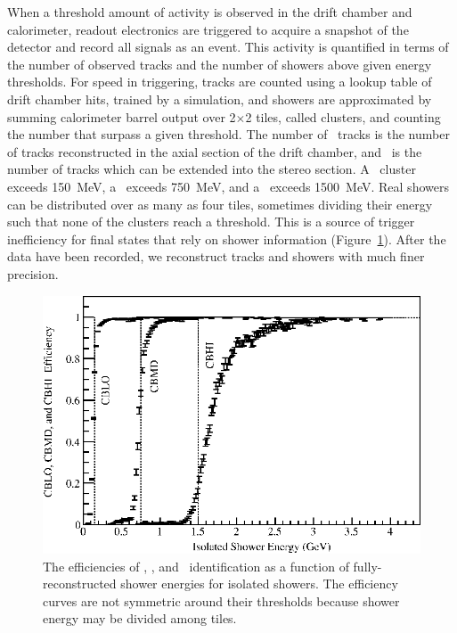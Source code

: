 \documentclass{cornell}
\begin{document}
When a threshold amount of activity is observed in the drift chamber
and calorimeter, readout electronics are triggered to acquire a
snapshot of the detector and record all signals as an event.  This
activity is quantified in terms of the number of observed tracks and
the number of showers above given energy thresholds.  For speed in
triggering, tracks are counted using a lookup table of drift chamber
hits, trained by a simulation, and showers are approximated by summing
calorimeter barrel output over 2$\times$2 tiles, called clusters, and
counting the number that surpass a given threshold.  The number of
\axial\ tracks is the number of tracks reconstructed in the axial
section of the drift chamber, and \stereo\ is the number of tracks
which can be extended into the stereo section.  A \cblo\ cluster
exceeds 150~MeV, a \cbmd\ exceeds 750~MeV, and a \cbhi\ exceeds
1500~MeV.  Real showers can be distributed over as many as four tiles,
sometimes dividing their energy such that none of the clusters reach a
threshold.  This is a source of trigger inefficiency for final states
that rely on shower information (Figure~\ref{topher}).  After the data
have been recorded, we reconstruct tracks and showers with much finer
precision.

\begin{figure}[p]
  \begin{center}
    \includegraphics[width=\linewidth]{topher}
  \end{center}
  \caption[Efficiencies of \cblo, \cbmd, and \cbhi\
  identification]{\label{topher} The efficiencies of \cblo, \cbmd, and
  \cbhi\ identification as a function of fully-reconstructed shower
  energies for isolated showers.  The efficiency curves are not
  symmetric around their thresholds because shower energy may be
  divided among tiles.}
\end{figure}
\end{document}
